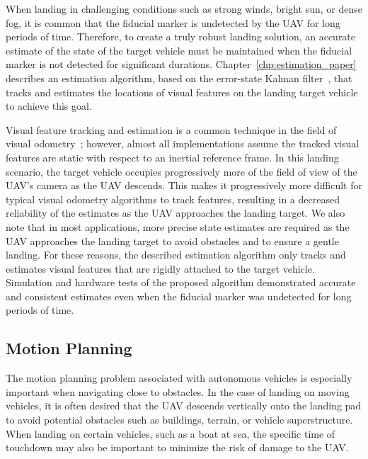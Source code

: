 When landing in challenging conditions such as strong winds, bright sun, or
dense fog, it is common that the fiducial marker is undetected by the UAV
for long periods of time.
Therefore, to create a truly robust landing solution, an accurate estimate of
the state of the target vehicle must be maintained when the fiducial marker is
not detected for significant durations.
Chapter~\ref{chp:estimation_paper}
describes an estimation algorithm, based on the error-state Kalman
filter~\cite{roumeliotis1999circumventing}, that tracks and estimates the locations of
visual features on the landing target vehicle to achieve this goal.

Visual feature
tracking and estimation is a common technique in the field of visual
odometry~\cite{qin2018vins}; however, almost all implementations assume the
tracked visual features are static with respect to an inertial reference frame.
In this landing scenario, the target vehicle occupies progressively more of the
field of view of the UAV's camera as the UAV descends. This makes it progressively
more difficult for typical visual odometry algorithms to track features,
resulting in a decreased
reliability of the estimates as the UAV approaches the landing target.
We also note that in most
applications, more precise state estimates are required as the UAV
approaches
the landing target to avoid obstacles and to ensure a gentle landing.
For these reasons, the described estimation algorithm
only tracks and estimates visual features that are rigidly attached to the
target vehicle.
Simulation and hardware tests of the proposed algorithm demonstrated accurate and consistent estimates
even when the fiducial marker was undetected
for long periods of time.

\subsection{Motion Planning}
The motion planning problem associated with autonomous vehicles is especially
important when 
navigating close to obstacles. In the case of landing on moving vehicles, it is
often desired that the UAV descends vertically onto the landing pad to avoid
potential obstacles such as buildings, terrain, or vehicle superstructure.
When landing on certain vehicles, such as a boat at sea, the specific time of
touchdown may also be important to minimize the risk of damage to the UAV.


